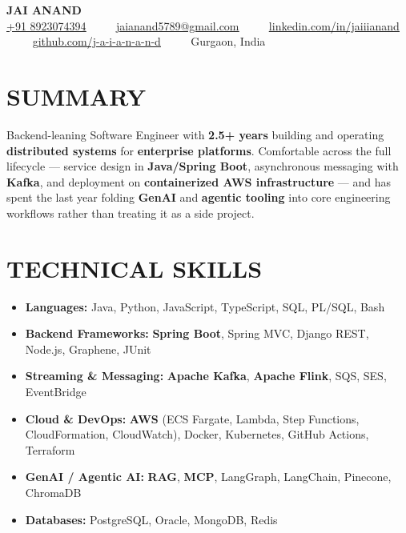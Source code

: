 \documentclass[letterpaper,10pt]{article}
\renewcommand{\normalsize}{%
  \fontsize{10.1}{12.25}\selectfont
}
\begin{document}
\begin{center}
    {\Huge \textbf{JAI ANAND}} \\ \vspace{4pt}
    \small
    \href{tel:+918923074394}{\underline{+91 8923074394}} ~~\textbullet~~ 
    \href{mailto:jaianand5789@gmail.com}{\underline{jaianand5789@gmail.com}} ~~\textbullet~~ 
    \href{https://linkedin.com/in/jaiiianand/}{\underline{linkedin.com/in/jaiiianand}} ~~\textbullet~~ 
    \href{https://github.com/j-a-i-a-n-a-n-d}{\underline{github.com/j-a-i-a-n-a-n-d}} ~~\textbullet~~
    Gurgaon, India
\end{center}

\section{SUMMARY}
Backend-leaning Software Engineer with \textbf{2.5+ years} building and operating \textbf{distributed systems} for \textbf{enterprise platforms}. Comfortable across the full lifecycle --- service design in \textbf{Java/Spring Boot}, asynchronous messaging with \textbf{Kafka}, and deployment on \textbf{containerized AWS infrastructure} --- and has spent the last year folding \textbf{GenAI} and \textbf{agentic tooling} into core engineering workflows rather than treating it as a side project.

\section{TECHNICAL SKILLS}
  \begin{itemize}[leftmargin=0.0in, label={}, itemsep=1pt, parsep=0pt, topsep=0pt]
    \item \normalsize{
     \textbf{\normalsize Languages:}{ Java, Python, JavaScript, TypeScript, SQL, PL/SQL, Bash}
    }
    \item \normalsize{
     \textbf{\normalsize Backend Frameworks:}{ \textbf{Spring Boot}, Spring MVC, Django REST, Node.js, Graphene, JUnit}
    }
    \item \normalsize{
     \textbf{\normalsize Streaming \& Messaging:}{ \textbf{Apache Kafka}, \textbf{Apache Flink}, SQS, SES, EventBridge}
    }
    \item \normalsize{
     \textbf{\normalsize Cloud \& DevOps:}{ \textbf{AWS} (ECS Fargate, Lambda, Step Functions, CloudFormation, CloudWatch), Docker, Kubernetes, GitHub Actions, Terraform}
    }
    \item \normalsize{
     \textbf{\normalsize GenAI / Agentic AI:}{ \textbf{RAG}, \textbf{MCP}, LangGraph, LangChain, Pinecone, ChromaDB}
    }
    \item \normalsize{
     \textbf{\normalsize Databases:}{ PostgreSQL, Oracle, MongoDB, Redis}
    }
  \end{itemize}
\end{document}
